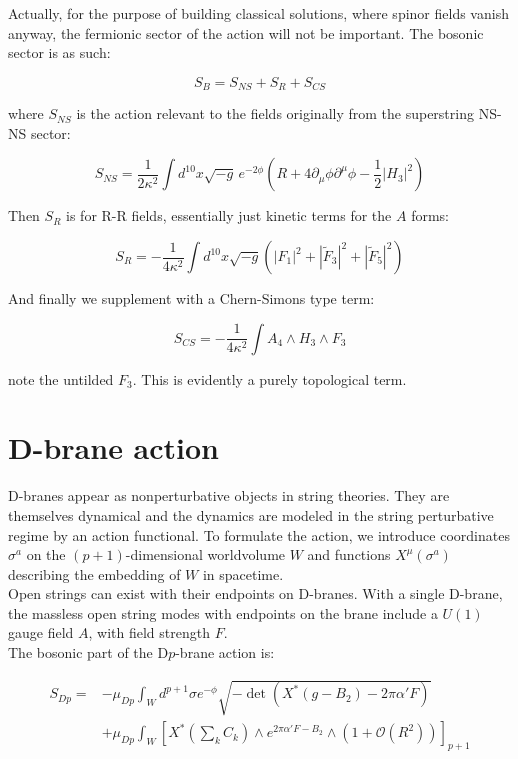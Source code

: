 Actually, for the purpose of building classical solutions, where spinor fields vanish anyway, the fermionic sector of the action will not be important. The bosonic sector is as such:

\[ S_B = S_{NS} + S_R + S_{CS} \]

where $S_{NS}$ is the action relevant to the fields originally from the superstring NS-NS sector:

\[ S_{NS} = \frac{1}{2\kappa^2} \int d^{10} x \sqrt{-g} \, e^{-2\phi} \left( R + 4 \partial_\mu \phi \partial^\mu \phi - \frac{1}{2} | H_3 |^2 \right) \]

Then $S_R$ is for R-R fields, essentially just kinetic terms for the $A$ forms:

\[ S_R = -\frac{1}{4\kappa^2} \int d^{10} x \sqrt{-g} 
\left(| F_1 |^2 + | \tilde{F}_3 |^2 + | \tilde{F}_5 |^2 \right)\]

And finally we supplement with a Chern-Simons type term:

\[ S_{CS} = -\frac{1}{4\kappa^2} \int A_4 \wedge H_3 \wedge F_3 \]

note the untilded $F_3$. This is evidently a purely topological term.


\section{D-brane action}

D-branes appear as nonperturbative objects in string theories. They are themselves dynamical and the dynamics are modeled in the string perturbative regime by an action functional\cite{ibanezU}. To formulate the action, we introduce coordinates $\sigma^a$ on the $(p+1)$-dimensional worldvolume $W$ and functions $X^\mu(\sigma^a)$ describing the embedding of $W$ in spacetime. \\

Open strings can exist with their endpoints on D-branes. With a single D-brane, the massless open string modes with endpoints on the brane include a $U(1)$ gauge field $A$, with field strength $F$.\\

The bosonic part of the D$p$-brane action is:


\begin{align}
	S_{Dp} = & -\mu_{Dp} \int_W d^{p+1}\sigma e^{-\phi} \sqrt{ - \det \left( X^{*}(g - B_2) - 2\pi\alpha' F \right)} \label{actionDBI}\\
& + \mu_{Dp} \int_W \left[ X^{*}\left(\sum_k C_k \right) \wedge e^{2\pi\alpha'F-B_2} \wedge (1 + \mathcal{O}(R^2))
\right]_{p+1} 	\label{actionCS}
\end{align}

